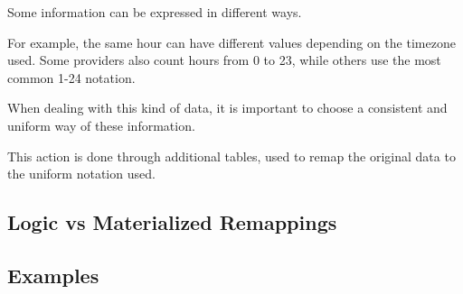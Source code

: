 Some information can be expressed in different ways.

For example, the same hour can have different values depending on the timezone used.
Some providers also count hours from 0 to 23, while others use the most common 1-24 notation.

When dealing with this kind of data, it is important to choose a consistent and uniform way of these information.

This action is done through additional tables, used to remap the original data to the uniform notation used.

\subsection{Logic vs Materialized Remappings}
    

\subsection{Examples}
    

